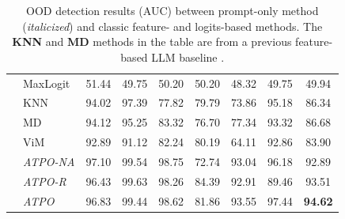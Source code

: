 \begin{table}[t!]
{\begin{tabular}{|c|l|ccccccc|}
                             &  MaxLogit                     &   51.44  &  49.75  &   50.20  &   50.20  &   48.32  &   49.75  &   \multicolumn{1}{|c|}{49.94}  \\ 
                             &  KNN                    &   94.02  &   97.39  &   77.82  &   79.79  &   73.86  &   95.18  &   \multicolumn{1}{|c|}{86.34}  \\ 
                             &  MD                   &   94.12  &   95.25  &   83.32  &   76.70  &   77.34  &   93.32  &   \multicolumn{1}{|c|}{86.68}  \\ 
                             &  ViM                    &   92.89  &   91.12  &   82.24  &   80.19  &   64.11  &   92.86  &   \multicolumn{1}{|c|}{83.90}  \\ %
                             &  \cellcolor{rowGray} \textit{ATPO-NA}  &  \cellcolor{rowGray} 97.10  &  \cellcolor{rowGray} 99.54  &  \cellcolor{rowGray} 98.75  &  \cellcolor{rowGray} 72.74  &  \cellcolor{rowGray} 93.04  &  \cellcolor{rowGray} 96.18  &   \multicolumn{1}{|c|}{\cellcolor{rowGray} 92.89}  \\ %
                             &  \cellcolor{rowGray} \textit{ATPO-R}  &  \cellcolor{rowGray} 96.43  &  \cellcolor{rowGray} 99.63  &  \cellcolor{rowGray} 98.26  &  \cellcolor{rowGray} 84.39  &  \cellcolor{rowGray} 92.91  &  \cellcolor{rowGray} 89.46  &   \multicolumn{1}{|c|}{\cellcolor{rowGray} 93.51}  \\ 
                            &  \cellcolor{rowGray} \textit{ATPO}  &  \cellcolor{rowGray} 96.83  & \cellcolor{rowGray} 99.44  &  \cellcolor{rowGray} 98.62  & \cellcolor{rowGray} 81.86  & \cellcolor{rowGray} 93.55  &  \cellcolor{rowGray} 97.44  &  \multicolumn{1}{|c|}{\cellcolor{rowGray} \textbf{94.62}}  \\  \hline
\end{tabular}
}
\caption{OOD detection results (AUC) between \syst prompt-only method (\textit{italicized}) and classic feature- and logits-based methods. %
The \textbf{KNN} and \textbf{MD} methods in the table are from a previous feature-based LLM baseline \citep{uppaal2023fine}.  %
}
\label{tab:atpo_results}
\end{table}

